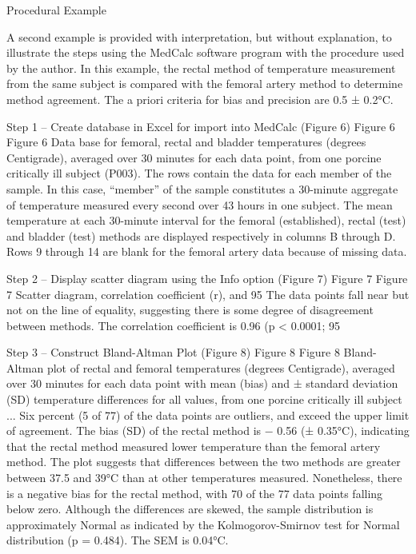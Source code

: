 \documentclass[]{article}
\begin{document}
\newpage

Procedural Example

A second example is provided with interpretation, but without explanation, to illustrate the steps using the MedCalc software program with the procedure used by the author. In this example, the rectal method of temperature measurement from the same subject is compared with the femoral artery method to determine method agreement. The a priori criteria for bias and precision are 0.5 ± 0.2°C.

Step 1 – Create database in Excel for import into MedCalc (Figure 6)
Figure 6
Figure 6
Data base for femoral, rectal and bladder temperatures (degrees Centigrade), averaged over 30 minutes for each data point, from one porcine critically ill subject (P003).
The rows contain the data for each member of the sample. In this case, “member” of the sample constitutes a 30-minute aggregate of temperature measured every second over 43 hours in one subject. The mean temperature at each 30-minute interval for the femoral (established), rectal (test) and bladder (test) methods are displayed respectively in columns B through D. Rows 9 through 14 are blank for the femoral artery data because of missing data.

Step 2 – Display scatter diagram using the Info option (Figure 7)
Figure 7
Figure 7
Scatter diagram, correlation coefficient (r), and 95 %
The data points fall near but not on the line of equality, suggesting there is some degree of disagreement between methods. The correlation coefficient is 0.96 (p < 0.0001; 95%

Step 3 – Construct Bland-Altman Plot (Figure 8)
Figure 8
Figure 8
Bland-Altman plot of rectal and femoral temperatures (degrees Centigrade), averaged over 30 minutes for each data point with mean (bias) and ± standard deviation (SD) temperature differences for all values, from one porcine critically ill subject ...
Six percent (5 of 77) of the data points are outliers, and exceed the upper limit of agreement. The bias (SD) of the rectal method is − 0.56 (± 0.35°C), indicating that the rectal method measured lower temperature than the femoral artery method. The plot suggests that differences between the two methods are greater between 37.5 and 39°C than at other temperatures measured. Nonetheless, there is a negative bias for the rectal method, with 70 of the 77 data points falling below zero. Although the differences are skewed, the sample distribution is approximately Normal as indicated by the Kolmogorov-Smirnov test for Normal distribution (p = 0.484). The SEM is 0.04°C.
\end{document}
